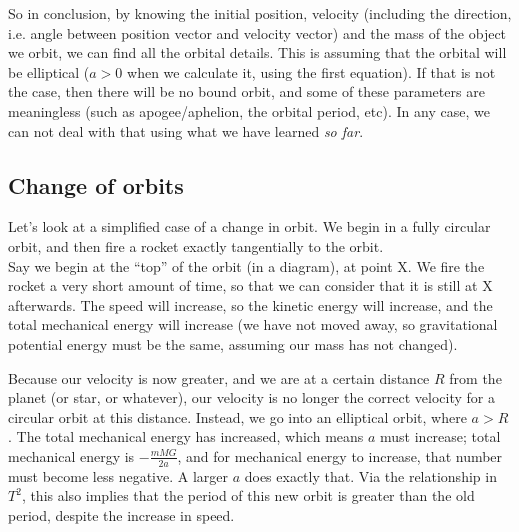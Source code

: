 So in conclusion, by knowing the initial position, velocity (including the direction, i.e. angle between position vector and velocity vector) and the mass of the object we orbit, we can find all the orbital details. This is assuming that the orbital will be elliptical ($a > 0$ when we calculate it, using the first equation). If that is not the case, then there will be no bound orbit, and some of these parameters are meaningless (such as apogee/aphelion, the orbital period, etc). In any case, we can not deal with that using what we have learned \emph{so far}.

\subsection{Change of orbits}

Let's look at a simplified case of a change in orbit. We begin in a fully circular orbit, and then fire a rocket exactly tangentially to the orbit.\\
Say we begin at the ``top'' of the orbit (in a diagram), at point X. We fire the rocket a very short amount of time, so that we can consider that it is still at X afterwards. The speed will increase, so the kinetic energy will increase, and the total mechanical energy will increase (we have not moved away, so gravitational potential energy must be the same, assuming our mass has not changed).

Because our velocity is now greater, and we are at a certain distance $R$ from the planet (or star, or whatever), our velocity is no longer the correct velocity for a circular orbit at this distance. Instead, we go into an elliptical orbit, where $a > R$. The total mechanical energy has increased, which means $a$ must increase; total mechanical energy is $-\frac{m M G}{2 a}$, and for mechanical energy to increase, that number must become less negative. A larger $a$ does exactly that. Via the relationship in $T^2$, this also implies that the period of this new orbit is greater than the old period, despite the increase in speed.

\begin{figure}[H]
  \centering
{}
\end{figure}

